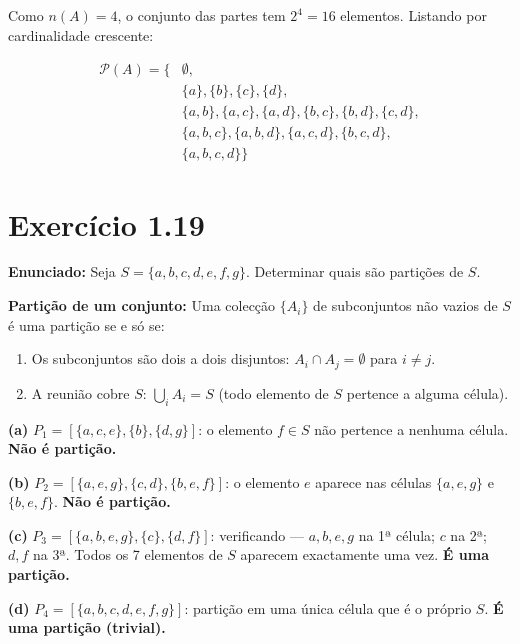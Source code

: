 \documentclass[12pt,a4paper]{article}
\begin{document}
Como $n(A) = 4$, o conjunto das partes tem $2^4 = 16$ elementos. Listando por cardinalidade crescente:

\begin{align*}
\mathcal{P}(A) = \{&\emptyset, \\
&\{a\}, \{b\}, \{c\}, \{d\}, \\
&\{a,b\}, \{a,c\}, \{a,d\}, \{b,c\}, \{b,d\}, \{c,d\}, \\
&\{a,b,c\}, \{a,b,d\}, \{a,c,d\}, \{b,c,d\}, \\
&\{a,b,c,d\}\}
\end{align*}

\section*{Exercício 1.19}

\textbf{Enunciado:} Seja $S = \{a,b,c,d,e,f,g\}$. Determinar quais são partições de $S$.

\begin{teoribox}
\textbf{Partição de um conjunto:} Uma colecção $\{A_i\}$ de subconjuntos não vazios de $S$ é uma partição se e só se:
\begin{enumerate}[label=(\roman*)]
  \item Os subconjuntos são dois a dois disjuntos: $A_i \cap A_j = \emptyset$ para $i \neq j$.
  \item A reunião cobre $S$: $\bigcup_i A_i = S$ (todo elemento de $S$ pertence a alguma célula).
\end{enumerate}
\end{teoribox}

\textbf{(a)} $P_1 = [\{a,c,e\}, \{b\}, \{d,g\}]$: o elemento $f \in S$ não pertence a nenhuma célula. \textbf{Não é partição.}

\textbf{(b)} $P_2 = [\{a,e,g\}, \{c,d\}, \{b,e,f\}]$: o elemento $e$ aparece nas células $\{a,e,g\}$ e $\{b,e,f\}$. \textbf{Não é partição.}

\textbf{(c)} $P_3 = [\{a,b,e,g\}, \{c\}, \{d,f\}]$: verificando --- $a,b,e,g$ na 1ª célula; $c$ na 2ª; $d,f$ na 3ª. Todos os 7 elementos de $S$ aparecem exactamente uma vez. \textbf{É uma partição.}

\textbf{(d)} $P_4 = [\{a,b,c,d,e,f,g\}]$: partição em uma única célula que é o próprio $S$. \textbf{É uma partição (trivial).}

\end{document}
